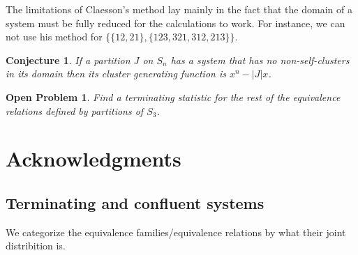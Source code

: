 \documentclass[openany, a4paper, 11pt, english]{article}
\newtheorem{openproblem}[theorem]{Open Problem}
\newtheorem{conjecture}[theorem]{Conjecture}
\theoremstyle{definition}
\newcommand{\Sym}{S}
\begin{document}
The limitations of Claesson's method lay mainly in the fact that the domain of a
system must be fully reduced for the calculations to work. For instance, we can not use his
method for $\{ \{ 12, 21 \}, \{ 123, 321, 312, 213 \} \}$.

\begin{conjecture}
    If a partition $J$ on $\Sym_n$ has a system that has no non-self-clusters in
    its domain then its cluster generating function is $x^n-|J|x$.
\end{conjecture}

\begin{openproblem}
    Find a terminating statistic for the rest of the equivalence relations
    defined by partitions of $\Sym_3$.
\end{openproblem}

\section*{Acknowledgments}




\begin{appendices}
\section{Terminating and confluent systems}
We categorize the equivalence families/equivalence relations by what their joint
distribition is.
\begin{multicols}{2}

\end{multicols}
\end{appendices}
\end{document}
